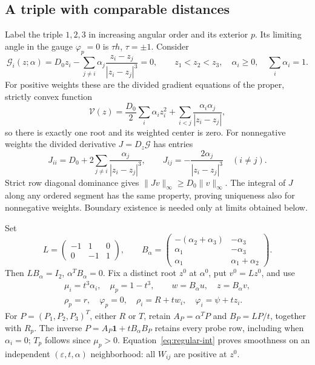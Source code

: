 \documentclass[11pt,a4paper]{article}
\numberwithin{equation}{section}
\theoremstyle{remark}
\newcommand{\eps}{\varepsilon}
\newcommand{\one}{\boldsymbol{1}}
\newcommand{\norm}[1]{\lVert#1\rVert}
\begin{document}
\subsection{A triple with comparable distances}
\label{subsec:regular}
Label the triple $1,2,3$ in increasing angular order and its exterior $p$. Its limiting angle in the gauge $\varphi_p=0$ is $\tau h$, $\tau=\pm1$. Consider
\begin{equation}\label{eq:internal}
 \mathcal G_i(z;\alpha)=D_0z_i-
 \sum_{j\ne i}\alpha_j\frac{z_i-z_j}{|z_i-z_j|^3}=0,
 \qquad z_1<z_2<z_3,\quad \alpha_i\ge0,\quad\sum_i\alpha_i=1.
\end{equation}
For positive weights these are the divided gradient equations of the proper, strictly convex function
\[
 \mathcal V(z)=\frac{D_0}2\sum_i\alpha_i z_i^2+
 \sum_{i<j}\frac{\alpha_i\alpha_j}{|z_i-z_j|},
\]
so there is exactly one root and its weighted center is zero. For nonnegative weights the divided derivative $J=D_z\mathcal G$ has entries
\begin{equation}\label{eq:internal-J}
 J_{ii}=D_0+2\sum_{j\ne i}\frac{\alpha_j}{|z_i-z_j|^3},\qquad
 J_{ij}=-\frac{2\alpha_j}{|z_i-z_j|^3}\quad(i\ne j).
\end{equation}
Strict row diagonal dominance gives $\norm{Jv}_\infty\ge D_0\norm v_\infty$. The integral of $J$ along any ordered segment has the same property, proving uniqueness also for nonnegative weights. Boundary existence is needed only at limits obtained below.

Set
\begin{equation}\label{eq:LB}
 L=\begin{pmatrix}-1&1&0\\0&-1&1\end{pmatrix},\qquad
 B_\alpha=\begin{pmatrix}-(\alpha_2+\alpha_3)&-\alpha_3\\
 \alpha_1&-\alpha_3\\\alpha_1&\alpha_1+\alpha_2\end{pmatrix}.
\end{equation}
Then $LB_\alpha=I_2$, $\alpha^TB_\alpha=0$. Fix a distinct root $z^0$ at $\alpha^0$, put $v^0=Lz^0$, and use
\begin{equation}\label{eq:regular-coordinates}
 \begin{gathered}
 \mu_i=t^3\alpha_i,\quad\mu_p=1-t^3,\qquad
 w=B_\alpha u,\quad z=B_\alpha v,\\
 \rho_p=r,\quad\varphi_p=0,\quad
 \rho_i=R+tw_i,\quad\varphi_i=\psi+tz_i.
 \end{gathered}
\end{equation}
For $P=(P_1,P_2,P_3)^T$, either $R$ or $T$, retain $A_P=\alpha^TP$ and $B_P=LP/t$, together with $R_p$. The inverse $P=A_P\one+tB_\alpha B_P$ retains every probe row, including when $\alpha_i=0$; $T_p$ follows since $\mu_p>0$. Equation~\eqref{eq:regular-int} proves smoothness on an independent $(\eps,t,\alpha)$ neighborhood: all $W_{ij}$ are positive at $z^0$.
\end{document}
